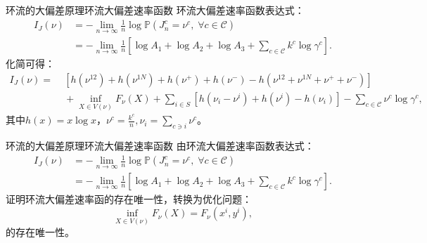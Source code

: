 \documentclass{beamer}
\begin{document}
\begin{frame}{环流的大偏差原理}{环流大偏差速率函数}
	环流大偏差速率函数表达式：
	\begin{equation*}
		\begin{split}
			I_J(\nu) &= -\lim_{n\to\infty}\frac{1}{n}\log\mathbb{P}\left(J^c_n=\nu^c,\;\forall c\in\mathcal{C}\right)\\
			&= -\lim_{n\to\infty}\frac{1}{n}\left[\log A_1+\log A_2+\log A_3+\sum_{c\in\mathcal{C}}k^c\log\gamma^c\right].
		\end{split}
	\end{equation*}
	化简可得：
	\begin{equation*}\label{ratefunction}
		\begin{split}
			I_J(\nu) =&\; \left[h\left(\nu^{12}\right)+h\left(\nu^{1N}\right)
				+h\left(\nu^+\right)+h\left(\nu^-\right)-h\left(\nu^{12}+\nu^{1N}+\nu^++\nu^-\right)\right] \\
			&\;+\inf_{X\in V(\nu)}F_{\nu}(X)+\sum_{i\in S}\left[ h\left(\nu_i-\nu^i\right)+h\left(\nu^i\right)
				-h\left(\nu_i\right)\right]-\sum_{c\in\mathcal{C}}\nu^c\log\gamma^c,
		\end{split}
	\end{equation*}
	其中$h(x) = x \log x$，$\nu^c = \frac{k^c}{n}, \nu_i=\sum_{c\ni i}\nu^c$。
\end{frame}

\begin{frame}{环流的大偏差原理}{环流大偏差速率函数}
	由环流大偏差速率函数表达式：
	\begin{equation*}
		\begin{split}
			I_J(\nu) &= -\lim_{n\to\infty}\frac{1}{n}\log\mathbb{P}\left(J^c_n=\nu^c,\;\forall c\in\mathcal{C}\right)\\
			&= -\lim_{n\to\infty}\frac{1}{n}\left[\log A_1+\log A_2+\log A_3+\sum_{c\in\mathcal{C}}k^c\log\gamma^c\right].
		\end{split}
	\end{equation*}
	证明环流大偏差速率函的存在唯一性，转换为优化问题：
	\begin{equation*}
		\inf_{X\in V(\nu)}F_{\nu}(X) = F_{\nu}(x^i,y^i),
	\end{equation*}
	的存在唯一性。
\end{frame}
\end{document}
